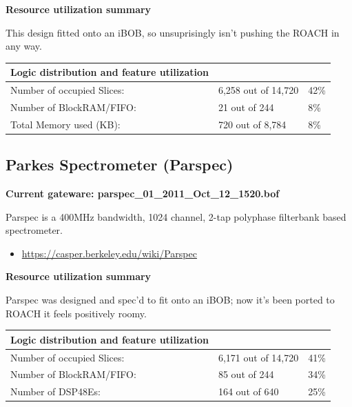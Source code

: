 \documentclass[letterpaper,10pt,english]{sphinxmanual}
\begin{document}
\textbf{Resource utilization summary}

This design fitted onto an iBOB, so unsuprisingly isn't pushing the ROACH in any
way.

\begin{tabulary}{\linewidth}{|L|L|L|}
\hline
\textbf{\relax 
Logic distribution and feature utilization
} & \textbf{\relax } & \textbf{\relax }\\\hline

Number of occupied Slices:
 & 
6,258 out of  14,720
 & 
42\%
\\\hline

Number of BlockRAM/FIFO:
 & 
21 out of     244
 & 
8\%
\\\hline

Total Memory used (KB):
 & 
720 out of   8,784
 & 
8\%
\\\hline
\end{tabulary}



\subsection{Parkes Spectrometer (Parspec)}
\label{gateware:parkes-spectrometer-parspec}
\textbf{Current gateware: parspec\_01\_2011\_Oct\_12\_1520.bof}

Parspec is a 400MHz bandwidth, 1024 channel, 2-tap polyphase filterbank based
spectrometer.
\begin{itemize}
\item {} 
\href{https://casper.berkeley.edu/wiki/Parspec}{https://casper.berkeley.edu/wiki/Parspec}

\end{itemize}

\textbf{Resource utilization summary}

Parspec was designed and spec'd to fit onto an iBOB; now it's been ported to
ROACH it feels positively roomy.

\begin{tabulary}{\linewidth}{|L|L|L|}
\hline
\textbf{\relax 
Logic distribution and feature utilization
} & \textbf{\relax } & \textbf{\relax }\\\hline

Number of occupied Slices:
 & 
6,171 out of  14,720
 & 
41\%
\\\hline

Number of BlockRAM/FIFO:
 & 
85 out of     244
 & 
34\%
\\\hline

Number of DSP48Es:
 & 
164 out of     640
 & 
25\%
\\\hline
\end{tabulary}
\end{document}
